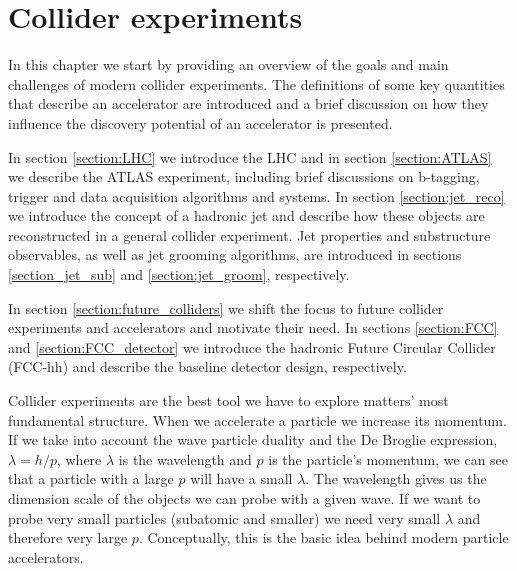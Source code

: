 
\chapter{Collider experiments}
\label{chapter:exp}

In this chapter we start by providing an overview of the goals and main challenges of modern collider experiments. The definitions of some key quantities that describe an accelerator are introduced and a brief discussion on how they influence the discovery potential of an accelerator is presented. 

In section \ref{section:LHC} we introduce the LHC and in section \ref{section:ATLAS} we describe the ATLAS experiment, including brief discussions on b-tagging, trigger and data acquisition algorithms and systems. In section \ref{section:jet_reco} we introduce the concept of a hadronic jet and describe how these objects are reconstructed in a general collider experiment. Jet properties and substructure observables, as well as jet grooming algorithms, are introduced in sections \ref{section_jet_sub} and \ref{section:jet_groom}, respectively. 

In section \ref{section:future_colliders} we shift the focus to future collider experiments and accelerators and motivate their need. In sections \ref{section:FCC} and \ref{section:FCC_detector} we introduce the hadronic Future Circular Collider (FCC-hh) and describe the baseline detector design, respectively.

Collider experiments are the best tool we have to explore matters' most fundamental structure. 
When we accelerate a particle we increase its momentum. If we take into account the wave particle duality and the De Broglie expression, $\lambda=h/p$, where $\lambda$ is the wavelength and $p$ is the particle's momentum, we can see that a particle with a large $p$ will have a small $\lambda$. The wavelength gives us the dimension scale of the objects we can probe with a given wave. If we want to probe very small particles (subatomic and smaller) we need very small $\lambda$ and therefore very large $p$. Conceptually, this is the basic idea behind modern particle accelerators. 


